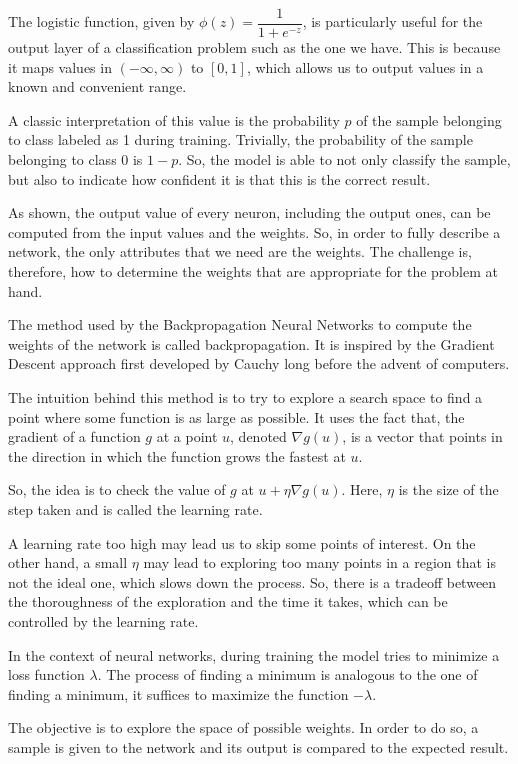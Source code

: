 The logistic function, given by $\phi(z) = \dfrac{1}{1+e^{-z}}$, is particularly useful for the output layer of a classification problem such as the one we have.
This is because it maps values in $(-\infty, \infty)$ to $[0,1]$, which allows us to output values in a known and convenient range.

A classic interpretation of this value is the probability $p$ of the sample belonging to class labeled as 1 during training.
Trivially, the probability of the sample belonging to class 0 is $1-p$.
So, the model is able to not only classify the sample, but also to indicate how confident it is that this is the correct result.

As shown, the output value of every neuron, including the output ones, can be computed from the input values and the weights.
So, in order to fully describe a network, the only attributes that we need are the weights.
The challenge is, therefore, how to determine the weights that are appropriate for the problem at hand.

The method used by the Backpropagation Neural Networks to compute the weights of the network is called backpropagation.
It is inspired by the Gradient Descent approach first developed by Cauchy \cite{lemarechal2012cauchy} long before the advent of computers.

The intuition behind this method is to try to explore a search space to find a point where some function is as large as possible.
It uses the fact that, the gradient of a function $g$ at a point $u$, denoted $\nabla g(u)$, is a vector that points in the direction in which the function grows the fastest at $u$.

So, the idea is to check the value of $g$ at $u + \eta \nabla g(u)$.
Here, $\eta$ is the size of the step taken and is called the learning rate.

A learning rate too high may lead us to skip some points of interest.
On the other hand, a small $\eta$ may lead to exploring too many points in a region that is not the ideal one, which slows down the process.
So, there is a tradeoff between the thoroughness of the exploration and the time it takes, which can be controlled by the learning rate.

In the context of neural networks, during training the model tries to minimize a loss function $\lambda$.
The process of finding a minimum is analogous to the one of finding a minimum, it suffices to maximize the function $-\lambda$.

The objective is to explore the space of possible weights.
In order to do so, a sample is given to the network and its output is compared to the expected result.

